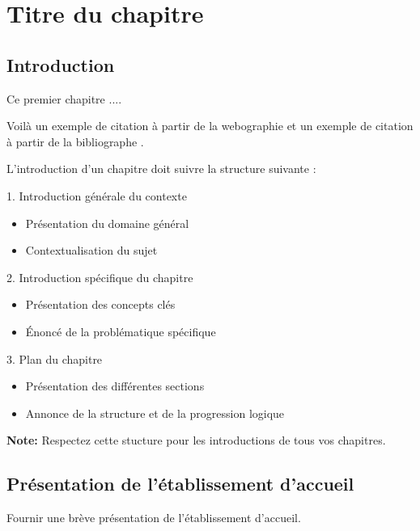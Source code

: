 \chapter{Titre du chapitre}
\label{Chapitre1}
\section{Introduction}
\label{sec:Introduction1}
Ce premier chapitre .... 

Voilà un exemple de citation à partir de la webographie \cite{stackoverflow:latex} et un exemple de citation à partir de la bibliographe \cite{Severson2019}.

\begin{tcolorbox}[
   title=Important,
   colback=blue!5,
   colframe=blue!75,
   coltitle=white,
   fonttitle=\bfseries
]
L'introduction d'un chapitre doit suivre la structure suivante :

1. Introduction générale du contexte
   \begin{itemize}
      \item Présentation du domaine général
      \item Contextualisation du sujet
   \end{itemize}

2. Introduction spécifique du chapitre
   \begin{itemize}
      \item Présentation des concepts clés
      \item Énoncé de la problématique spécifique
   \end{itemize}

3. Plan du chapitre
   \begin{itemize}
      \item Présentation des différentes sections
      \item Annonce de la structure et de la progression logique
   \end{itemize}
   \textbf{Note:} Respectez cette stucture pour les introductions de tous vos chapitres.
\end{tcolorbox}

\section{Présentation de l'établissement d'accueil}
\label{scetion1}
Fournir une brève présentation de l'établissement d'accueil.

